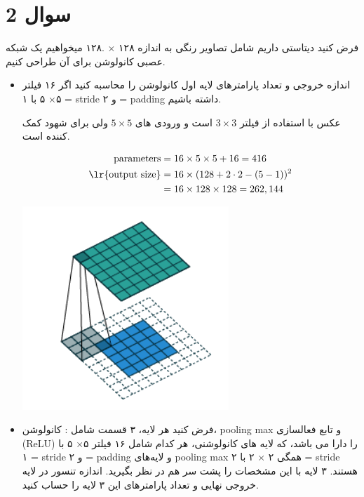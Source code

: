 \section{سوال 2}

فرض کنید دیتاستی داریم شامل تصاویر رنگی به اندازه ۱۲۸ × .۱۲۸ میخواهیم یک شبکه عصبی کانولوشن
برای آن طراحی کنیم.

\begin{itemize}
	\item {
	      اندازه خروجی و تعداد پارامترهای لایه اول کانولوشن را محاسبه کنید اگر ۱۶ فیلتر ۵× ۵
	      با ۱ = stride و ۲ = padding داشته باشیم.
	      }

	      \begin{qsolve}[]
		      \begin{minipage}[l]{0.69\linewidth}
			      عکس با استفاده از فیلتر $3\times3$ است و ورودی های $5\times5$ ولی برای شهود کمک کننده است.

			      \begin{align*}
				      \text{parameters}       & =16\times5\times5+16=416          \\
				      \text{\lr{output size}} & =16\times(128+2\cdot2-(5-1))^2 \\
				                              & =16\times128\times128=262,144
			      \end{align*}
		      \end{minipage}
		      \begin{minipage}[r]{0.3\linewidth}
			      \includegraphics*[width=\linewidth]{pics/conv-pad-stride.png}
		      \end{minipage}
	      \end{qsolve}
	\item {
	      فرض کنید هر لایه، ۳ قسمت شامل : کانولوشن، pooling max و تابع فعالسازی (ReLU) را دارا
	      می باشد، که لایه های کانولوشنی، هر کدام شامل ۱۶ فیلتر ۵× ۵ با ۱ = stride و ۲ = padding و
	      لایەهای pooling max همگی ۲ × ۲ با ۲ = stride هستند. ۳ لایه با این مشخصات را پشت سر
	      هم در نظر بگیرید. اندازه تنسور در لایه خروجی نهایی و تعداد پارامترهای این ۳ لایه را حساب کنید.

}
\end{itemize}
